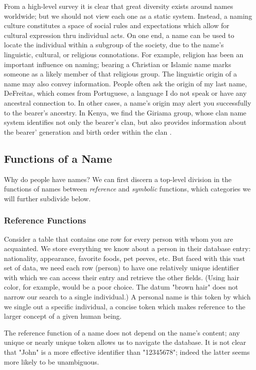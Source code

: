 From a high-level survey it is clear that great diversity exists around names
worldwide; but we should not view each one as a static system. Instead, a naming
culture constitutes a space of social rules and expectations which allow for
cultural expression thru individual acts. On one end, a name can be used to
locate the individual within a subgroup of the society, due to the name's
linguistic, cultural, or religious connotations. For example, religion has been
an important influence on naming; bearing a Christian or Islamic name marks
someone as a likely member of that religious group. The linguistic origin of a
name may also convey information. People often ask the origin of my last name,
DeFreitas, which comes from Portuguese, a language I do not speak or have any
ancestral connection to. In other cases, a name's origin may alert you
successfully to the bearer's ancestry. In Kenya, we find the Giriama group,
whose clan name system identifies not only the bearer's clan, but also provides
information about the bearer' generation and birth order within the clan
\textcite{parkin89}.

\subsection{Functions of a Name}

Why do people have names? We can first discern a top-level division in the
functions of names between \textit{reference} and \textit{symbolic} functions,
which categories we will further subdivide below.

\subsubsection{Reference Functions}

Consider a table that contains one row for every person with whom you are
acquainted. We store everything we know about a person in their database entry:
nationality, appearance, favorite foods, pet peeves, etc. But faced with this
vast set of data, we need each row (person) to have one relatively unique
identifier with which we can access their entry and retrieve the other fields.
(Using hair color, for example, would be a poor choice. The datum "brown hair"
does not narrow our search to a single individual.) A personal name is this
token by which we single out a specific individual, a concise token which makes
reference to the larger concept of a given human being.

The reference function of a name does not depend on the name's content; any
unique or nearly unique token allows us to navigate the database. It is not
clear that "John" is a more effective identifier than "12345678"; indeed the
latter seems more likely to be unambiguous.

